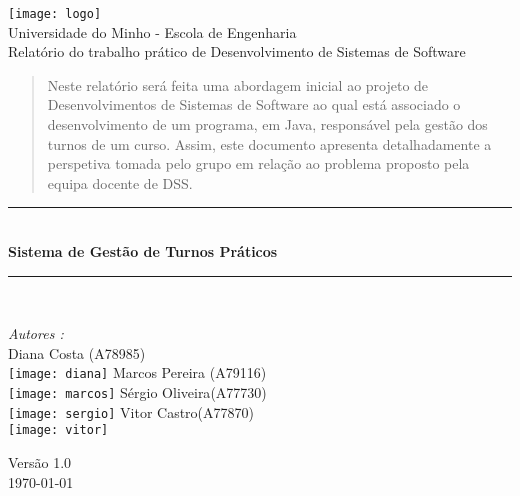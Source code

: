 \documentclass[a4paper]{article}
\begin{document}
\begin{titlepage}
\begin{center}


\texttt{[image: logo]}\\[0.3cm]

{\large Universidade do Minho - Escola de Engenharia}\\[0.5cm]

{\large Relatório do trabalho prático de Desenvolvimento de Sistemas de Software}\\[0.5cm]

\begin{abstract}

Neste relatório será feita uma abordagem inicial ao projeto de Desenvolvimentos de Sistemas de Software ao qual está associado o desenvolvimento de um programa, em Java, responsável pela gestão dos turnos de um curso. Assim, este documento apresenta detalhadamente a perspetiva tomada pelo grupo em relação ao problema proposto pela equipa docente de DSS.

\hspace{3mm}
\end{abstract}

\rule{\linewidth}{0.5mm} \\[0.4cm]
{ \huge \bfseries Sistema de Gestão de Turnos Práticos \\[0.4cm] }
\rule{\linewidth}{0.5mm} \\[1.5cm]

\noindent
\begin{minipage}{0.4\textwidth}
  \begin{flushleft} \large
    \emph{Autores :}\\
    Diana Costa \textsc{(A78985)}\\
    \texttt{[image: diana]}\break
    Marcos Pereira \textsc{(A79116)}\\
    \texttt{[image: marcos]}\break
    Sérgio Oliveira\textsc{(A77730)}\\
    \texttt{[image: sergio]}\break
    Vitor Castro\textsc{(A77870)}\\
    \texttt{[image: vitor]}\break
  \end{flushleft}
\end{minipage}%
\vfill

{\large Versão 1.0 \\ \today}

\end{center}
\end{titlepage}
\end{document}
